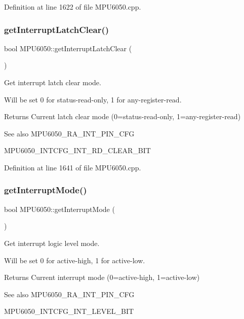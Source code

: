 Definition at line 1622 of file M\+P\+U6050.\+cpp.

\mbox{\label{classMPU6050_a9a098a607e20c64b60e155da35b8264f}} 
\subsubsection{\texorpdfstring{getInterruptLatchClear()}{getInterruptLatchClear()}}
{\footnotesize\ttfamily bool M\+P\+U6050\+::get\+Interrupt\+Latch\+Clear (\begin{DoxyParamCaption}{ }\end{DoxyParamCaption})}



Get interrupt latch clear mode. 

Will be set 0 for status-\/read-\/only, 1 for any-\/register-\/read. \begin{DoxyReturn}{Returns}
Current latch clear mode (0=status-\/read-\/only, 1=any-\/register-\/read) 
\end{DoxyReturn}
\begin{DoxySeeAlso}{See also}
M\+P\+U6050\+\_\+\+R\+A\+\_\+\+I\+N\+T\+\_\+\+P\+I\+N\+\_\+\+C\+FG 

M\+P\+U6050\+\_\+\+I\+N\+T\+C\+F\+G\+\_\+\+I\+N\+T\+\_\+\+R\+D\+\_\+\+C\+L\+E\+A\+R\+\_\+\+B\+IT 
\end{DoxySeeAlso}


Definition at line 1641 of file M\+P\+U6050.\+cpp.

\mbox{\label{classMPU6050_a58da1dfb39eb34e3a09a9b0bf4d87f29}} 
\subsubsection{\texorpdfstring{getInterruptMode()}{getInterruptMode()}}
{\footnotesize\ttfamily bool M\+P\+U6050\+::get\+Interrupt\+Mode (\begin{DoxyParamCaption}{ }\end{DoxyParamCaption})}



Get interrupt logic level mode. 

Will be set 0 for active-\/high, 1 for active-\/low. \begin{DoxyReturn}{Returns}
Current interrupt mode (0=active-\/high, 1=active-\/low) 
\end{DoxyReturn}
\begin{DoxySeeAlso}{See also}
M\+P\+U6050\+\_\+\+R\+A\+\_\+\+I\+N\+T\+\_\+\+P\+I\+N\+\_\+\+C\+FG 

M\+P\+U6050\+\_\+\+I\+N\+T\+C\+F\+G\+\_\+\+I\+N\+T\+\_\+\+L\+E\+V\+E\+L\+\_\+\+B\+IT 
\end{DoxySeeAlso}


